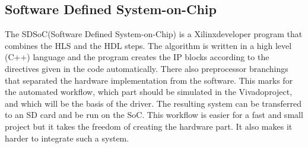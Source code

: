 \subsection{Software Defined System-on-Chip} %
The SDSoC\texttrademark (Software Defined System-on-Chip) is a Xilinx\texttrademark developer program that combines the HLS and the HDL steps.
The algorithm is written in a high level (C++) language and the program creates the IP blocks according to the directives given in the code automatically.
There also preprocessor branchings that separated the hardware implementation from the software.
This marks for the automated workflow, which part should be simulated in the Vivado\texttrademark project, and which will be the basis of the driver.
The resulting system can be transferred to an SD card and be run on the SoC.
This workflow is easier for a fast and small project but it takes the freedom of creating the hardware part.
It also makes it harder to integrate such a system.

\clearpage